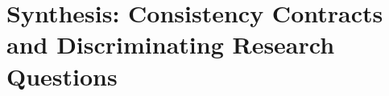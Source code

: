 \chapter{Synthesis: Consistency Contracts and Discriminating Research Questions}\label{ch:C34}









